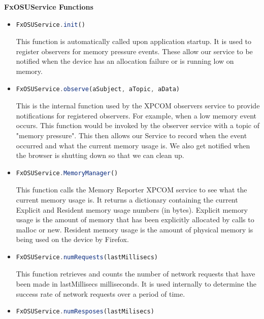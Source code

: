 \documentclass[12pt]{article}
\begin{document}
\textbf{FxOSUService Functions}
\begin{itemize}
  \item \begin{lstlisting}[language=JavaScript]
FxOSUService.init()
    \end{lstlisting}  
    This function is automatically called upon application startup.  It is used to register observers for memory pressure events.  These allow our service to be notified when the device has an allocation failure or is running low on memory.  \\
  \item \begin{lstlisting}[language=JavaScript]
FxOSUService.observe(aSubject, aTopic, aData)
    \end{lstlisting} 
    This is the internal function used by the XPCOM observers service to provide notifications for registered observers. For example, when a low memory event occurs.  This function would be invoked by the observer service with a topic of "memory pressure".  This then allows our Service to record when the event occurred and what the current memory usage is.  We also get notified when the browser is shutting down so that we can clean up. \\
  \item \begin{lstlisting}[language=JavaScript]
FxOSUService.MemoryManager()
    \end{lstlisting} 
    This function calls the Memory Reporter XPCOM service to see what the current memory usage is.  It returns a dictionary containing the current Explicit and Resident memory usage numbers (in bytes).  Explicit memory usage is the amount of memory that has been explicitly allocated by calls to malloc or new.  Resident memory usage is the amount of physical memory is being used on the device by Firefox.  \\
  \item \begin{lstlisting}[language=JavaScript]
FxOSUService.numRequests(lastMillisecs)
    \end{lstlisting}  
    This function retrieves and counts the number of network requests that have been made in lastMillisecs milliseconds.  It is used internally to determine the success rate of network requests over a period of time.  
  \item \begin{lstlisting}[language=JavaScript]
FxOSUService.numResposes(lastMilisecs)
    \end{lstlisting} 

\end{itemize}
\end{document}
